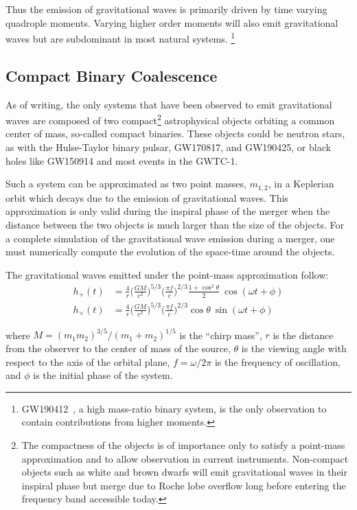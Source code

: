 \documentclass [12pt, proquest]{uwthesis}[2019]
\begin{document}
Thus the emission of gravitational waves is primarily driven by time varying quadrople moments. Varying higher order moments will also emit gravitational waves but are subdominant in most natural systems. \footnote{GW190412~\cite{GW190412}, a high mass-ratio binary system, is the only observation to contain contributions from higher moments.}

\subsection{Compact Binary Coalescence}\label{CBC}

As of writing, the only systems that have been observed to emit gravitational waves are composed of two compact\footnote{The compactness of the objects is of importance only to satisfy a point-mass approximation and to allow observation in current instruments. Non-compact objects such as white and brown dwarfs will emit gravitational waves in their inspiral phase but merge due to Roche lobe overflow long before entering the frequency band accessible today.} astrophysical objects orbiting a common center of mass, so-called compact binaries. These objects could be neutron stars, as with the Hulse-Taylor binary pulsar\cite{hulseTaylor}, GW170817\cite{GW170817}, and GW190425\cite{GW190425}, or black holes like GW150914\cite{GW150914} and most events in the GWTC-1\cite{GWTC}.

Such a system can be approximated as two point masses, $m_{1,2}$, in a Keplerian orbit which decays due to the emission of gravitational waves. This approximation is only valid during the inspiral phase of the merger when the distance between the two objects is much larger than the size of the objects. For a complete simulation of the gravitational wave emission during a merger, one must numerically compute the evolution of the space-time around the objects.~\cite{NGR}

The gravitational waves emitted under the point-mass approximation follow:
\begin{align}
h_+(t)&=\frac{4}{r}\bigg(\frac{GM}{c^2}\bigg)^{5/3} \bigg( \frac{\pi f}{c} \bigg)^{2/3} \frac{1+\cos^2\theta}{2} \ \cos(\omega t + \phi)\\
h_\times(t)&=\frac{4}{r}\bigg(\frac{GM}{c^2}\bigg)^{5/3} \bigg( \frac{\pi f}{c} \bigg)^{2/3} \cos\theta\ \sin(\omega t + \phi)
\end{align}

where $M=(m_1 m_2)^{3/5}/(m_1+m_2)^{1/5}$ is the ``chirp mass'', $r$ is the distance from the observer to the center of mass of the source, $\theta$ is the viewing angle with respect to the axis of the orbital plane, $f=\omega/2\pi$ is the frequency of oscillation, and $\phi$ is the initial phase of the system.
\end{document}
